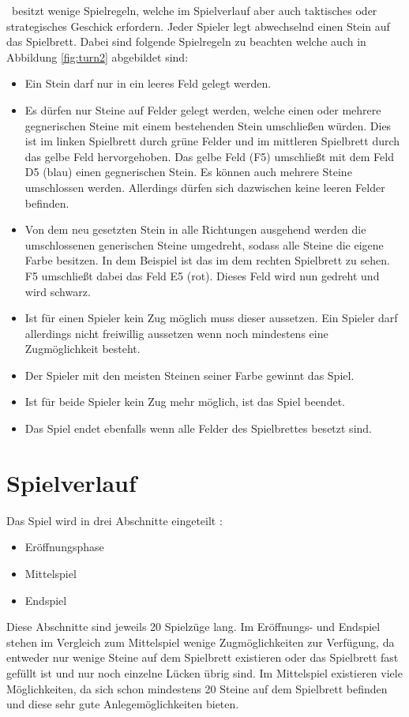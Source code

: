 \ot\ besitzt wenige Spielregeln, welche im Spielverlauf aber auch taktisches oder strategisches Geschick erfordern. Jeder Spieler legt abwechselnd einen Stein auf das Spielbrett. Dabei sind folgende Spielregeln zu beachten welche auch in Abbildung \ref{fig:turn2} abgebildet sind:
\begin{itemize}
\item Ein Stein darf nur in ein leeres Feld gelegt werden.
\item Es dürfen nur Steine auf Felder gelegt werden, welche einen oder mehrere gegnerischen Steine mit einem bestehenden Stein umschließen würden. Dies ist im linken Spielbrett durch grüne Felder und im mittleren Spielbrett durch das gelbe Feld hervorgehoben. Das gelbe Feld (F5) umschließt mit dem Feld D5 (blau) einen gegnerischen Stein. Es können auch mehrere Steine umschlossen werden. Allerdings dürfen sich dazwischen keine leeren Felder befinden.
\item Von dem neu gesetzten Stein in alle Richtungen ausgehend werden die umschlossenen generischen Steine umgedreht, sodass alle Steine die eigene Farbe besitzen. In dem Beispiel ist das im dem rechten Spielbrett zu sehen. F5 umschließt dabei das Feld E5 (rot). Dieses Feld wird nun gedreht und wird schwarz.
\item Ist für einen Spieler kein Zug möglich muss dieser aussetzen. Ein Spieler darf allerdings nicht freiwillig aussetzen wenn noch mindestens eine Zugmöglichkeit besteht.
\item Der Spieler mit den meisten Steinen seiner Farbe gewinnt das Spiel.
\item Ist für beide Spieler kein Zug mehr möglich, ist das Spiel beendet. 
\item Das Spiel endet ebenfalls wenn alle Felder des Spielbrettes besetzt sind.
\end{itemize}
\newpage
\section{Spielverlauf}
Das Spiel wird in drei Abschnitte eingeteilt \cite{Ortiz.}:
\begin{itemize}
\item Eröffnungsphase
\item Mittelspiel
\item Endspiel
\end{itemize}
Diese Abschnitte sind jeweils 20 Spielzüge lang.
Im Eröffnungs- und Endspiel stehen im Vergleich zum Mittelspiel wenige Zugmöglichkeiten zur Verfügung, da entweder nur wenige Steine auf dem Spielbrett existieren oder das Spielbrett fast gefüllt ist und nur noch einzelne Lücken übrig sind. Im Mittelspiel existieren viele Möglichkeiten, da sich schon mindestens 20 Steine auf dem Spielbrett befinden und diese sehr gute Anlegemöglichkeiten bieten. 

